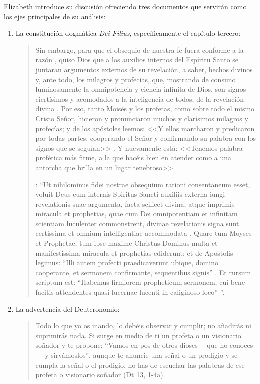 Elizabeth introduce su discusión ofreciendo tres documentos que servirán como los ejes principales de su análisis:
\begin{enumerate}
\item La constitución dogmática \emph{Dei Filius}, específicamente el capítulo tercero: \blockquote[{\Cite[\S\,3009]{vati1870df}}: \enquote{Ut nihilominus fidei nostrae obsequium rationi consentaneum  esset, voluit Deus cum internis Spiritus Sancti auxiliis externa iungi revelationis suae argumenta, facta scilicet divina, atque imprimis miracula et prophetias, quae cum Dei omnipotentiam et infinitam scientiam luculenter commonstrent, divinae revelationis signa sunt certissima et omnium intelligentiae accommodata . Quare tum Moyses et Prophetae, tum ipse maxime Christus Dominus multa et manifestissima miracula et prophetias ediderunt; et de Apostolis legimus: ``Illi autem profecti praedicaverunt ubique, domino cooperante, et sermonem confirmante, sequentibus signis'' . Et rursum scriptum est: ``Habemus firmiorem propheticum sermonem, cui bene facitis attendentes quasi lucernae lucenti in caliginoso loco'' }.]{Sin embargo, para que el obsequio de nuestra fe fuera conforme a la razón , quiso Dios que a los auxilios internos del Espíritu Santo se juntaran argumentos externos de su revelación, a saber, hechos divinos y, ante todo, los milagros y profecías, que, mostrando de consuno luminosamente la omnipotencia y ciencia infinita de Dios, son signos ciertísimos y acomodados a la inteligencia de todos, de la revelación divina . Por eso, tanto Moisés y los profetas, como sobre todo el mismo Cristo Señor, hicieron y pronunciaron muchos y clarísimos milagros y profecías; y de los apóstoles leemos: <<Y ellos marcharon y predicaron por todas partes, cooperando el Señor y confirmando su palabra con los signos que se seguían>> . Y nuevamente está: <<Tenemos palabra profética más firme, a la que hacéis bien en atender como a una antorcha que brilla en un lugar tenebroso>> }.
\item La advertencia del Deuteronomio: \blockquote{Todo lo que yo os mando, lo debéis observar y cumplir; no añadirás ni suprimirás nada. Si surge en medio de ti un profeta o un visionario soñador y te propone: \enquote{Vamos en pos de otros dioses ---que no conoces--- y sirvámoslos}, aunque te anuncie una señal o un prodigio y se cumpla la señal o el prodigio, no has de escuchar las palabras de ese profeta o visionario soñador (Dt 13, 1-4a).}

\end{enumerate}
